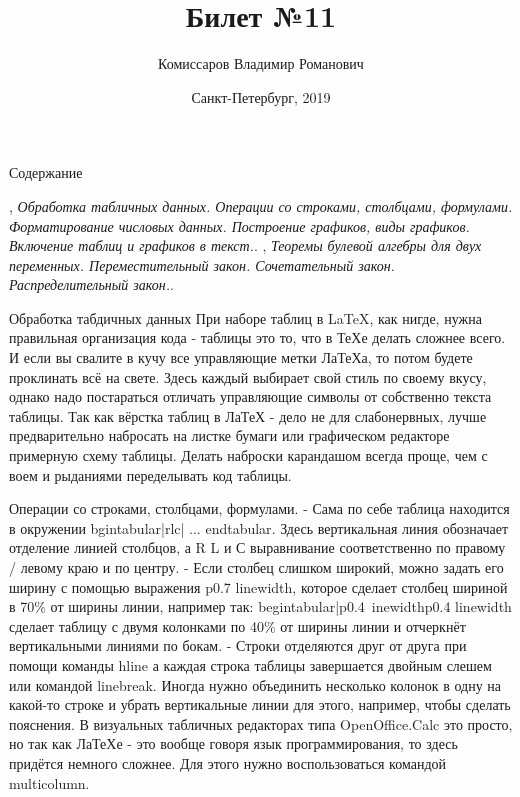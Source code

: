 \documentclass{beamer}
\begin{document}
\title{Билет №11} 
\author{Комиссаров Владимир Романович}
\date{Санкт-Петербург, 2019} 
\frame{\titlepage} 
\begin{frame}{Содержание}
\begin{thebibliography}{10}
\beamertemplatebookbibitems
{}
{}, {\em Обработка табличных данных. Операции со строками, столбцами, формулами. Форматирование числовых данных. Построение графиков, виды графиков. Включение таблиц и графиков в текст.}.
{}, {\em Теоремы булевой алгебры для двух переменных. Переместительный закон. Сочетательный закон. Распределительный закон.}.
\end{thebibliography}
\end{frame}

\begin{frame}{Обработка табдичных данных}
При наборе таблиц в LaTeX, как нигде, нужна правильная организация кода - таблицы это то, что в ТеХе делать сложнее всего. И если вы свалите в кучу все управляющие метки ЛаТеХа, то потом будете проклинать всё на свете. Здесь каждый выбирает свой стиль по своему вкусу, однако надо постараться отличать управляющие символы от собственно текста таблицы.
Так как вёрстка таблиц в ЛаТеХ - дело не для слабонервных, лучше предварительно набросать на листке бумаги или графическом редакторе примерную схему таблицы. Делать наброски карандашом всегда проще, чем с воем и рыданиями переделывать код таблицы.
\end{frame}

\begin{frame}{Операции со строками, столбцами, формулами.}
- Сама по себе таблица находится в окружении bgin{tabular}{|rlc|} ... end{tabular}. Здесь вертикальная линия обозначает отделение линией столбцов, а R L и С выравнивание соответственно по правому / левому краю и по центру.
- Если столбец слишком широкий, можно задать его ширину с помощью выражения p{0.7 linewidth}, которое сделает столбец шириной в 70\% от ширины линии, например так: begin{tabular}{|p{0.4\ inewidth}p{0.4 linewidth}} сделает таблицу с двумя колонками по 40\% от ширины линии и отчеркнёт вертикальными линиями по бокам.
- Строки отделяются друг от друга при помощи команды  hline а каждая строка таблицы завершается двойным слешем \\ или командой  linebreak.
Иногда нужно объединить несколько колонок в одну на какой-то строке и убрать вертикальные линии для этого, например, чтобы сделать пояснения. В визуальных табличных редакторах типа OpenOffice.Calc это просто, но так как ЛаТеХе - это вообще говоря язык программирования, то здесь придётся немного сложнее. Для этого нужно воспользоваться командой multicolumn.
\end{frame}
\end{document}
